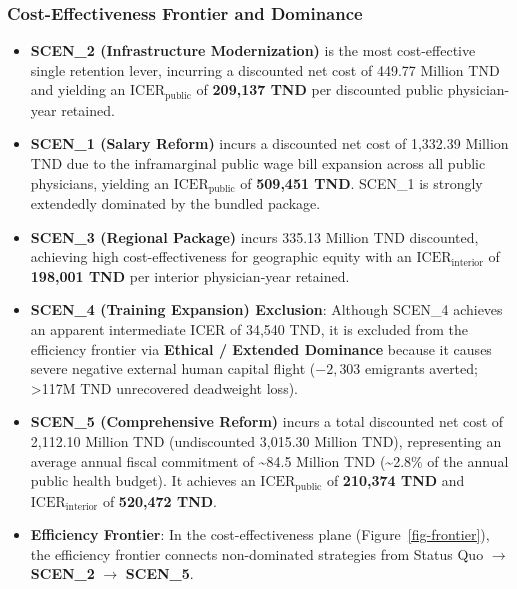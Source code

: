 \documentclass[
  11pt,
  a4paper]{article}
\providecommand{\tightlist}{%
  \setlength{\itemsep}{0pt}\setlength{\parskip}{0pt}}
\begin{document}
\subsubsection{Cost-Effectiveness Frontier and
Dominance}\label{cost-effectiveness-frontier-and-dominance}

\begin{itemize}
\tightlist
\item
  \textbf{SCEN\_2 (Infrastructure Modernization)} is the most
  cost-effective single retention lever, incurring a discounted net cost
  of 449.77 Million TND and yielding an \(\text{ICER}_{\text{public}}\)
  of \textbf{209,137 TND} per discounted public physician-year retained.
\item
  \textbf{SCEN\_1 (Salary Reform)} incurs a discounted net cost of
  1,332.39 Million TND due to the inframarginal public wage bill
  expansion across all public physicians, yielding an
  \(\text{ICER}_{\text{public}}\) of \textbf{509,451 TND}. SCEN\_1 is
  strongly extendedly dominated by the bundled package.
\item
  \textbf{SCEN\_3 (Regional Package)} incurs 335.13 Million TND
  discounted, achieving high cost-effectiveness for geographic equity
  with an \(\text{ICER}_{\text{interior}}\) of \textbf{198,001 TND} per
  interior physician-year retained.
\item
  \textbf{SCEN\_4 (Training Expansion) Exclusion}: Although SCEN\_4
  achieves an apparent intermediate ICER of 34,540 TND, it is excluded
  from the efficiency frontier via \textbf{Ethical / Extended Dominance}
  because it causes severe negative external human capital flight
  (\(-2,303\) emigrants averted; \textgreater117M TND unrecovered
  deadweight loss).
\item
  \textbf{SCEN\_5 (Comprehensive Reform)} incurs a total discounted net
  cost of 2,112.10 Million TND (undiscounted 3,015.30 Million TND),
  representing an average annual fiscal commitment of
  \textasciitilde84.5 Million TND (\textasciitilde2.8\% of the annual
  public health budget). It achieves an \(\text{ICER}_{\text{public}}\)
  of \textbf{210,374 TND} and \(\text{ICER}_{\text{interior}}\) of
  \textbf{520,472 TND}.
\item
  \textbf{Efficiency Frontier}: In the cost-effectiveness plane
  (Figure~\ref{fig-frontier}), the efficiency frontier connects
  non-dominated strategies from Status Quo \(\rightarrow\)
  \textbf{SCEN\_2} \(\rightarrow\) \textbf{SCEN\_5}.
\end{itemize}
\end{document}
